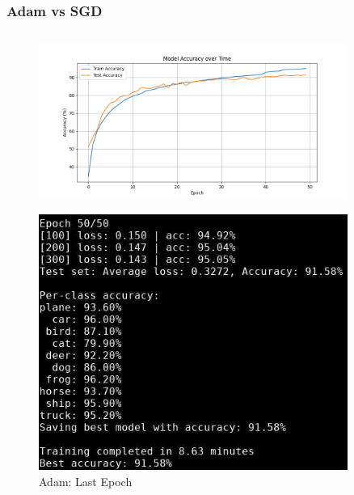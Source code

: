 \documentclass{beamer}
\begin{document}
\begin{frame}
\frametitle{Adam vs SGD}
\begin{columns}
    \begin{column}{0.5\textwidth}
        \begin{figure}[t]
            \centering
            \vspace{-0.4cm}
            \includegraphics[width=0.9\textwidth]{media/cifar10_cnn_accuracy.png}
        \end{figure}
        \vspace{-0.8cm}
        \begin{figure}[t]
            \centering
            \includegraphics[width=0.9\textwidth]{media/cnn_epoch_50.png}
            \vspace{-0.3cm}
            \caption{Adam: Last Epoch}
        \end{figure}
    \end{column}


\end{columns}
\end{frame}
\end{document}
